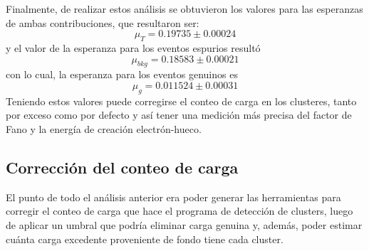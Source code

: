 \indent Finalmente, de realizar estos análisis se obtuvieron los valores para las esperanzas de ambas contribuciones, que resultaron ser:
\begin{equation*}
    \mu_{T} = 0.19735 \pm 0.00024
\end{equation*} 
y el valor de la esperanza para los eventos espurios resultó 
\begin{equation*}
    \mu_{bkg} = 0.18583 \pm 0.00021
\end{equation*}
con lo cual, la esperanza para los eventos genuinos es 
\begin{equation*}
    \mu_{g} = 0.011524 \pm 0.00031
\end{equation*}
Teniendo estos valores puede corregirse el conteo de carga en los clusteres, tanto por exceso como por defecto y así tener una medición más precisa del factor de Fano y la energía de creación electrón-hueco.

\subsection{Corrección del conteo de carga}
\noindent El punto de todo el análisis anterior era poder generar las herramientas para corregir el conteo de carga que hace el programa de detección de clusters, luego de aplicar un umbral que podría eliminar carga genuina y, además, poder estimar cuánta carga excedente proveniente de fondo tiene cada cluster.\\

